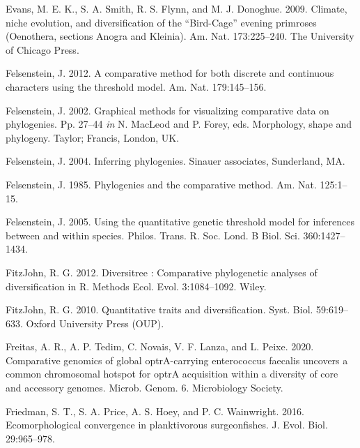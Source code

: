 \documentclass[fleqn,10pt,lineno]{wlpeerj} %
\newlength{\cslhangindent}
\newlength{\cslentryspacingunit} %
\newenvironment{CSLReferences}[2] %
 {%
  \setlength{\parindent}{0pt}
  \ifodd #1
  \let\oldpar\par
  \def\par{\hangindent=\cslhangindent\oldpar}
  \fi
  \setlength{\parskip}{#2\cslentryspacingunit}
 }%
 {}
\begin{document}
\begin{CSLReferences}{1}{0}
\leavevmode{}%
Evans, M. E. K., S. A. Smith, R. S. Flynn, and M. J. Donoghue. 2009. Climate, niche evolution, and diversification of the {{``Bird-Cage''}} evening primroses ({O}enothera, sections {A}nogra and {K}leinia). Am. Nat. 173:225--240. The University of Chicago Press.

\leavevmode{}%
Felsenstein, J. 2012. A comparative method for both discrete and continuous characters using the threshold model. Am. Nat. 179:145--156.

\leavevmode{}%
Felsenstein, J. 2002. Graphical methods for visualizing comparative data on phylogenies. Pp. 27--44 \emph{in} N. MacLeod and P. Forey, eds. Morphology, shape and phylogeny. Taylor; Francis, London, UK.

\leavevmode{}%
Felsenstein, J. 2004. Inferring phylogenies. Sinauer associates, Sunderland, MA.

\leavevmode{}%
Felsenstein, J. 1985. Phylogenies and the comparative method. Am. Nat. 125:1--15.

\leavevmode{}%
Felsenstein, J. 2005. Using the quantitative genetic threshold model for inferences between and within species. Philos. Trans. R. Soc. Lond. B Biol. Sci. 360:1427--1434.

\leavevmode{}%
FitzJohn, R. G. 2012. Diversitree : Comparative phylogenetic analyses of diversification in {R}. Methods Ecol. Evol. 3:1084--1092. Wiley.

\leavevmode{}%
FitzJohn, R. G. 2010. Quantitative traits and diversification. Syst. Biol. 59:619--633. Oxford University Press (OUP).

\leavevmode{}%
Freitas, A. R., A. P. Tedim, C. Novais, V. F. Lanza, and L. Peixe. 2020. Comparative genomics of global optrA-carrying enterococcus faecalis uncovers a common chromosomal hotspot for optrA acquisition within a diversity of core and accessory genomes. Microb. Genom. 6. Microbiology Society.

\leavevmode{}%
Friedman, S. T., S. A. Price, A. S. Hoey, and P. C. Wainwright. 2016. Ecomorphological convergence in planktivorous surgeonfishes. J. Evol. Biol. 29:965--978.


\end{CSLReferences}
\end{document}

